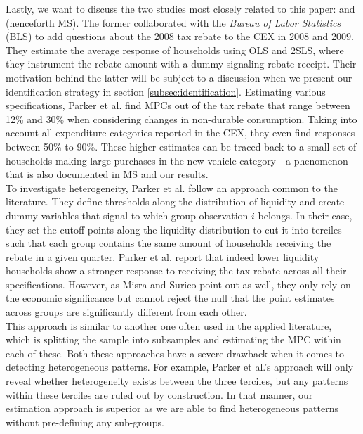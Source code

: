 Lastly, we want to discuss the two studies most closely related to this paper: \cite{parkeretal_2013} and \cite{misrasurico_2014} (henceforth MS). The former collaborated with the \textit{Bureau of Labor Statistics} (BLS) to add questions about the 2008 tax rebate to the CEX in 2008 and 2009. They estimate the average response of households using OLS and 2SLS, where they instrument the rebate amount with a dummy signaling rebate receipt. Their motivation behind the latter will be subject to a discussion when we present our identification strategy in section \ref{subsec:identification}. Estimating various specifications, Parker et al. find MPCs out of the tax rebate that range between 12\% and 30\% when considering changes in non-durable consumption. Taking into account all expenditure categories reported in the CEX, they even find responses between 50\% to 90\%. These higher estimates can be traced back to a small set of households making large purchases in the new vehicle category - a phenomenon that is also documented in MS and our results. \\
To investigate heterogeneity, Parker et al. follow an approach common to the literature. They define thresholds along the distribution of liquidity and create dummy variables that signal to which group observation $i$ belongs. In their case, they set the cutoff points along the liquidity distribution to cut it into terciles such that each group contains the same amount of households receiving the rebate in a given quarter. Parker et al. report that indeed lower liquidity households show a stronger response to receiving the tax rebate across all their specifications. However, as Misra and Surico point out as well, they only rely on the economic significance but cannot reject the null that the point estimates across groups are significantly different from each other. \\
This approach is similar to another one often used in the applied literature, which is splitting the sample into subsamples and estimating the MPC within each of these. Both these approaches have a severe drawback when it comes to detecting heterogeneous patterns. For example, Parker et al.'s approach will only reveal whether heterogeneity exists between the three terciles, but any patterns within these terciles are ruled out by construction. In that manner, our estimation approach is superior as we are able to find heterogeneous patterns without pre-defining any sub-groups. \\
